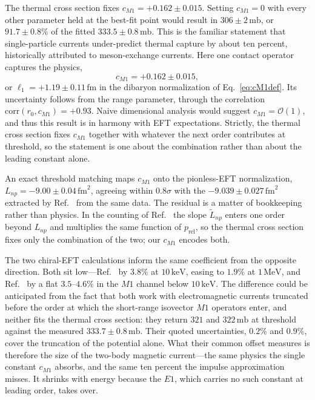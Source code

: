 \documentclass[
  aps,prd,twocolumn,nofootinbib,superscriptaddress,
  longbibliography,floatfix,preprintnumbers
]{revtex4-2}
\newcommand{\prel}{p_{\mathrm{rel}}}
\newcommand{\Mone}{M1}
\newcommand{\Eone}{E1}
\begin{document}
The thermal cross section fixes $c_{\Mone}=+0.162\pm0.015$. Setting $c_{\Mone}=0$ with every other parameter held at the best-fit point
would result in $306\pm2\,\mathrm{mb}$, or
$91.7\pm0.8\%$ of the fitted $333.5\pm0.8\,\mathrm{mb}$. This is the familiar statement that single-particle currents
under-predict thermal capture by about ten percent, historically attributed to
meson-exchange currents. Here one contact operator captures the physics,
\begin{equation}
  c_{\Mone} = +0.162\pm0.015 ,
  \label{eq:cM1fit}
\end{equation}
or $\ell_{1}=+1.19\pm0.11\,\mathrm{fm}$ in the dibaryon normalization of
Eq.~\eqref{eq:cM1def}. Its uncertainty follows from the range parameter, through the correlation
$\mathrm{corr}(r_{0},c_{\Mone})=+0.93$.
Naive dimensional analysis would suggest $c_{\Mone}=\mathcal{O}(1)$, and thus
this result is in harmony with EFT expectations. Strictly, the thermal cross
section fixes $c_{\Mone}$ together with whatever the next order contributes at
threshold, so the statement is one about the combination rather than about the
leading constant alone.

An exact threshold matching maps $c_{\Mone}$ onto the pionless-EFT
normalization, $L_{np}=-9.00\pm0.04\,\mathrm{fm}^{2}$, agreeing within
$0.8\sigma$ with the $-9.039\pm0.027\,\mathrm{fm}^{2}$ extracted by
Ref.~\cite{Rupak:1999rk} from the same data. The residual is a matter of
bookkeeping rather than physics. In the counting of Ref.~\cite{Rupak:1999rk} the
slope $\tilde{L}_{np}$ enters one order beyond $L_{np}$ and multiplies the same
function of $\prel$, so the thermal cross section fixes only the combination of
the two; our $c_{\Mone}$ encodes both.

The two chiral-EFT calculations inform the same
coefficient from the opposite direction. Both sit low---Ref.~\cite{Acharya:2021lrv}
by $3.8\%$ at $10\,\mathrm{keV}$, easing to $1.9\%$ at $1\,\mathrm{MeV}$, and
Ref.~\cite{Du:2022zds} by a flat $3.5$--$4.6\%$ in the $\Mone$ channel below
$10\,\mathrm{keV}$. The difference could be anticipated from the fact that both work with
electromagnetic currents truncated before the order at which the short-range
isovector $\Mone$ operators enter, and neither fits the thermal cross section:
they return $321$ and $322\,\mathrm{mb}$ at threshold against the measured
$333.7\pm0.8\,\mathrm{mb}$. Their quoted uncertainties, $0.2\%$ and $0.9\%$,
cover the truncation of the potential alone. What
their common offset measures is therefore the size of the two-body magnetic
current---the same physics the single constant $c_{\Mone}$ absorbs, and the same
ten percent the impulse approximation misses. It shrinks with energy because the
$\Eone$, which carries no such constant at leading order, takes over.
\end{document}
